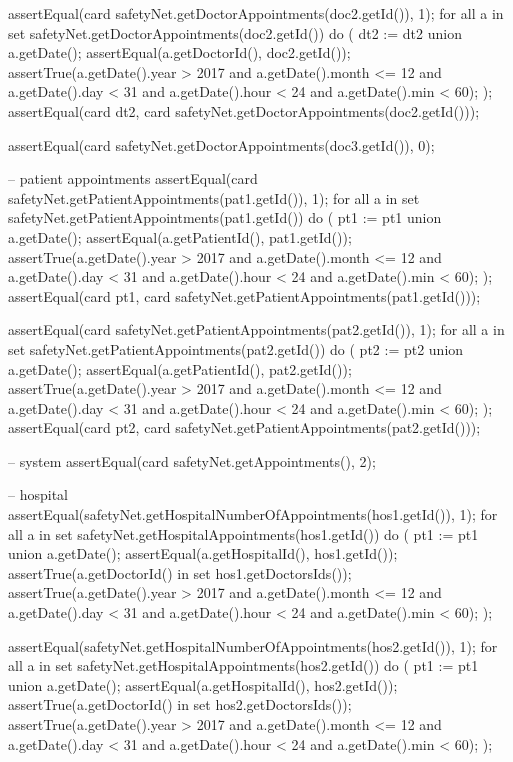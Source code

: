 \begin{vdmpp}[breaklines=true]
  assertEqual(card safetyNet.getDoctorAppointments(doc2.getId()), 1);
  for all a in set safetyNet.getDoctorAppointments(doc2.getId()) do (
   dt2 := dt2 union {a.getDate()};
   assertEqual(a.getDoctorId(), doc2.getId());
   assertTrue(a.getDate().year > 2017 and a.getDate().month <= 12 and a.getDate().day < 31 and a.getDate().hour < 24 and a.getDate().min < 60);
  );
  assertEqual(card dt2, card safetyNet.getDoctorAppointments(doc2.getId()));
  
  
  assertEqual(card safetyNet.getDoctorAppointments(doc3.getId()), 0);
  
  
  -- patient appointments
  assertEqual(card safetyNet.getPatientAppointments(pat1.getId()), 1);
  for all a in set safetyNet.getPatientAppointments(pat1.getId()) do (
   pt1 := pt1 union {a.getDate()};
   assertEqual(a.getPatientId(), pat1.getId());
   assertTrue(a.getDate().year > 2017 and a.getDate().month <= 12 and a.getDate().day < 31 and a.getDate().hour < 24 and a.getDate().min < 60);
  );
  assertEqual(card pt1, card safetyNet.getPatientAppointments(pat1.getId()));
  
  
  assertEqual(card safetyNet.getPatientAppointments(pat2.getId()), 1);
  for all a in set safetyNet.getPatientAppointments(pat2.getId()) do (
   pt2 := pt2 union {a.getDate()};
   assertEqual(a.getPatientId(), pat2.getId());
   assertTrue(a.getDate().year > 2017 and a.getDate().month <= 12 and a.getDate().day < 31 and a.getDate().hour < 24 and a.getDate().min < 60);
  );
  assertEqual(card pt2, card safetyNet.getPatientAppointments(pat2.getId()));
  
  -- system
  assertEqual(card safetyNet.getAppointments(), 2);
  
  -- hospital
  assertEqual(safetyNet.getHospitalNumberOfAppointments(hos1.getId()), 1);
  for all a in set safetyNet.getHospitalAppointments(hos1.getId()) do (
   pt1 := pt1 union {a.getDate()};
   assertEqual(a.getHospitalId(), hos1.getId());
   assertTrue(a.getDoctorId() in set hos1.getDoctorsIds());
   assertTrue(a.getDate().year > 2017 and a.getDate().month <= 12 and a.getDate().day < 31 and a.getDate().hour < 24 and a.getDate().min < 60);
  );
   
  assertEqual(safetyNet.getHospitalNumberOfAppointments(hos2.getId()), 1);  
  for all a in set safetyNet.getHospitalAppointments(hos2.getId()) do (
   pt1 := pt1 union {a.getDate()};
   assertEqual(a.getHospitalId(), hos2.getId());
   assertTrue(a.getDoctorId() in set hos2.getDoctorsIds());
   assertTrue(a.getDate().year > 2017 and a.getDate().month <= 12 and a.getDate().day < 31 and a.getDate().hour < 24 and a.getDate().min < 60);
  );
  

\end{vdmpp}
